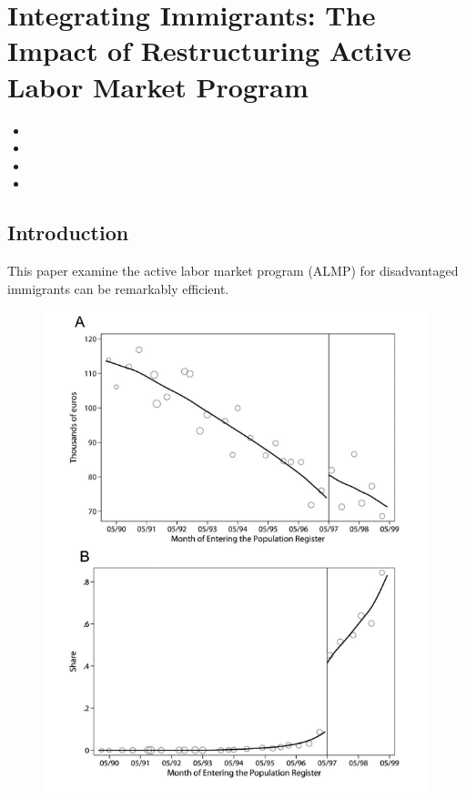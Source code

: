\documentclass[../root]{subfiles}
\begin{document}
    \chapter{Integrating Immigrants: The Impact of Restructuring Active Labor Market Program}

    \begin{shortsummary}
        \begin{itemize}
            \item {} %
            \item {}
            \item {}
            \item {}
        \end{itemize}
    \end{shortsummary}

    \section{Introduction}

    This paper examine the active labor market program (ALMP) for disadvantaged immigrants can be remarkably efficient. \\
    
    \begin{figure}[h]
        \includegraphics[width=12cm]{0703sugiyama/Figure1.png}
    \end{figure}
    
\end{document}
